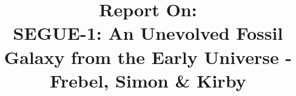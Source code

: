 \documentclass{aastex631}
\begin{document}
\title{Report On:\\SEGUE-1: An Unevolved Fossil Galaxy from the Early Universe - Frebel, Simon \& Kirby}


\end{document}
